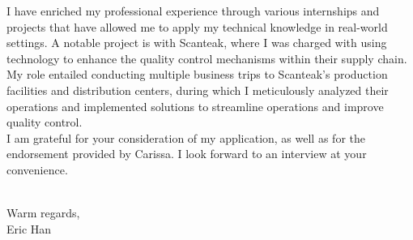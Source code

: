 \documentclass[11pt, a4paper]{article}
\begin{document}
\begin{minipage}[t]{0.95\textwidth}
{  I have enriched my professional experience through various internships and projects that have allowed me to apply my technical knowledge in real-world settings.
  A notable project is with Scanteak, where I was charged with using technology to enhance the quality control mechanisms within their supply chain. 
  My role entailed conducting multiple business trips to Scanteak's production facilities and distribution centers, 
  during which I meticulously analyzed their operations and implemented solutions to streamline operations and improve quality control.
  \\[.5em]
  I am grateful for your consideration of my application, as well as for the endorsement provided by Carissa.
  I look forward to an interview at your convenience.
}\end{minipage}\\[1em]

Warm regards,\\
Eric Han\\
\end{document}
